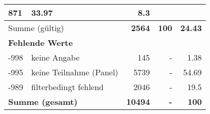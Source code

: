 \begin{longtable}{lXrrr}
       \num{871} &
       \num[round-mode=places,round-precision=2]{33.97} &
         \num[round-mode=places,round-precision=2]{8.3} \\
     \midrule
     \multicolumn{2}{l}{Summe (gültig)} &
       \textbf{\num{2564}} &
     \textbf{\num{100}} &
       \textbf{\num[round-mode=places,round-precision=2]{24.43}} \\
     \multicolumn{5}{l}{\textbf{Fehlende Werte}}\\
       -998 &
       keine Angabe &
         \num{145} &
        - &
         \num[round-mode=places,round-precision=2]{1.38} \\
       -995 &
       keine Teilnahme (Panel) &
         \num{5739} &
        - &
         \num[round-mode=places,round-precision=2]{54.69} \\
       -989 &
       filterbedingt fehlend &
         \num{2046} &
        - &
         \num[round-mode=places,round-precision=2]{19.5} \\
     \midrule
     \multicolumn{2}{l}{\textbf{Summe (gesamt)}} &
          \textbf{\num{10494}} &
        \textbf{-} &
        \textbf{\num{100}} \\
     \bottomrule
     \end{longtable}
     
